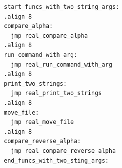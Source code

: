 \documentclass[tikz]{standalone}
\begin{document}
\begin{lrbox}{\indirectCfiCode}
\begin{lstlisting}[language=myasm,style=smaller]
start_funcs_with_two_string_args:
.align 8
compare_alpha:
  jmp real_compare_alpha
.align 8
run_command_with_arg:
  jmp real_run_command_with_arg
.align 8
print_two_strings:
  jmp real_print_two_strings
.align 8
move_file:
  jmp real_move_file
.align 8
compare_reverse_alpha:
  jmp real_compare_reverse_alpha
end_funcs_with_two_sting_args:
\end{lstlisting}
\end{lrbox}



\end{document}
